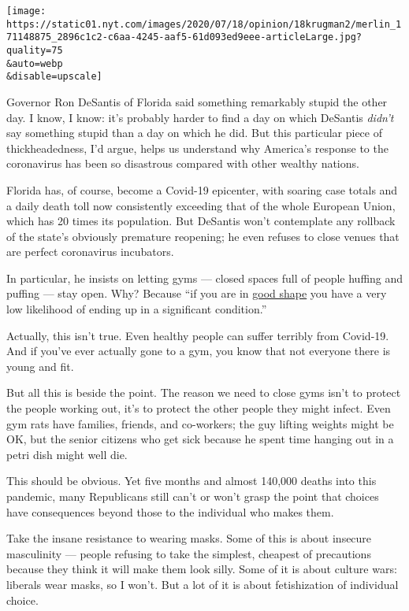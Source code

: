\texttt{[image: https://static01.nyt.com/images/2020/07/18/opinion/18krugman2/merlin\_171148875\_2896c1c2-c6aa-4245-aaf5-61d093ed9eee-articleLarge.jpg?quality=75\\\&auto=webp\\\&disable=upscale]}

Governor Ron DeSantis of Florida said something remarkably stupid the
other day. I know, I know: it's probably harder to find a day on which
DeSantis \emph{didn't} say something stupid than a day on which he did.
But this particular piece of thickheadedness, I'd argue, helps us
understand why America's response to the coronavirus has been so
disastrous compared with other wealthy nations.

Florida has, of course, become a Covid-19 epicenter, with soaring case
totals and a daily death toll now consistently exceeding that of the
whole European Union, which has 20 times its population. But DeSantis
won't contemplate any rollback of the state's obviously premature
reopening; he even refuses to close venues that are perfect coronavirus
incubators.

In particular, he insists on letting gyms --- closed spaces full of
people huffing and puffing --- stay open. Why? Because ``if you are in
\href{https://www.palmbeachpost.com/news/20200717/despite-11000-new-coronavirus-cases-desantis-defies-white-house-task-force}{good
shape} you have a very low likelihood of ending up in a significant
condition.''

Actually, this isn't true. Even healthy people can suffer terribly from
Covid-19. And if you've ever actually gone to a gym, you know that not
everyone there is young and fit.

But all this is beside the point. The reason we need to close gyms isn't
to protect the people working out, it's to protect the other people they
might infect. Even gym rats have families, friends, and co-workers; the
guy lifting weights might be OK, but the senior citizens who get sick
because he spent time hanging out in a petri dish might well die.

This should be obvious. Yet five months and almost 140,000 deaths into
this pandemic, many Republicans still can't or won't grasp the point
that choices have consequences beyond those to the individual who makes
them.

Take the insane resistance to wearing masks. Some of this is about
insecure masculinity --- people refusing to take the simplest, cheapest
of precautions because they think it will make them look silly. Some of
it is about culture wars: liberals wear masks, so I won't. But a lot of
it is about fetishization of individual choice.

